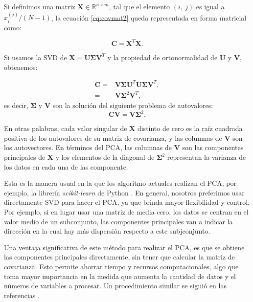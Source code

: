 Si definimos una matriz $\mathbf{X} \in \mathbb{R}^{n \times m}$, tal que el elemento $(i,\ j)$ es igual a $x_i^{(j)}/(N-1)$, la ecuación \eqref{eq:covmat2} queda representada en forma matricial como:

\begin{equation}
	\mathbf{C} = \mathbf{X}^T  \mathbf{X}.
\end{equation}

Si usamos la SVD de $\mathbf{X} = \mathbf{U} \mathbf{\Sigma} \mathbf{V}^T$ y la propiedad de ortonormalidad de $\mathbf{U}$ y $\mathbf{V}$, obtenemos:

\begin{eqnarray}
	\mathbf{C} =& \mathbf{V} \mathbf{\Sigma} \mathbf{U}^T \mathbf{U} \mathbf{\Sigma} \mathbf{V}^T, \\
	=& \mathbf{V} \mathbf{\Sigma}^2 \mathbf{V}^T,
\end{eqnarray}
es decir, $\mathbf{\Sigma}$ y $\mathbf{V}$ son la solución del siguiente problema de autovalores:
\begin{equation}
	\mathbf{C} \mathbf{V} = \mathbf{V} \mathbf{\Sigma}^2.
\end{equation}

En otras palabras, cada valor singular de $\mathbf{X}$ distinto de cero es la raíz cuadrada positiva de los autovalores de su matriz de covarianza, y las columnas de $\mathbf{V}$ son los autovectores. En términos del PCA, las columnas de $\mathbf{V}$ son las componentes principales de $\mathbf{X}$ y los elementos de la diagonal de $\mathbf{\Sigma}^2$ representan la varianza de los datos en cada una de las componente.

Esta es la manera usual en la que los algoritmo actuales realizan el PCA, por ejemplo, la librería \emph{scikit-learn} de Python \cite{scikit-learn}. En general, nosotros preferimos usar directamente SVD para hacer el PCA, ya que brinda mayor flexibilidad y control. Por ejemplo, si en lugar usar una matriz de media cero, los datos se centran en el valor medio de un subconjunto, las componentes principales van a indicar la dirección en la cual hay más dispersión respecto a este subjconjunto.

Una ventaja significativa de este método para realizar el PCA, es que se obtiene las componentes principales directamente, sin tener que calcular la matriz de covarianza. Esto permite ahorrar tiempo y recursos computacionales, algo que toma mayor importancia en la medida que aumenta la cantidad de datos y el números de variables a procesar. Un procedimiento similar se siguió en las referencias \cite{Gonzalez_2023, Gonzalez_2021}.

